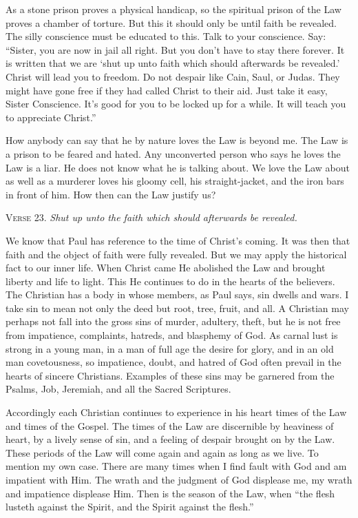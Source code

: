 As a stone prison proves a physical handicap, so the spiritual prison of the Law proves a chamber of torture. But this it should only be until faith be revealed. The silly conscience must be educated to this. Talk to your conscience. Say: “Sister, you are now in jail all right. But you don’t have to stay there forever. It is written that we are ‘shut up unto faith which should afterwards be revealed.’ Christ will lead you to freedom. Do not despair like Cain, Saul, or Judas. They might have gone free if they had called Christ to their aid. Just take it easy, Sister Conscience. It’s good for you to be locked up for a while. It will teach you to appreciate Christ.”

How anybody can say that he by nature loves the Law is beyond me. The Law is a prison to be feared and hated. Any unconverted person who says he loves the Law is a liar. He does not know what he is talking about. We love the Law about as well as a murderer loves his gloomy cell, his straight-jacket, and the iron bars in front of him. How then can the Law justify us?

\textsc{Verse} 23. \emph{Shut up unto the faith which should afterwards be revealed.}

We know that Paul has reference to the time of Christ’s coming. It was then that faith and the object of faith were fully revealed. But we may apply the historical fact to our inner life. When Christ came He abolished the Law and brought liberty and life to light. This He continues to do in the hearts of the believers. The Christian has a body in whose members, as Paul says, sin dwells and wars. I take sin to mean not only the deed but root, tree, fruit, and all. A Christian may perhaps not fall into the gross sins of murder, adultery, theft, but he is not free from impatience, complaints, hatreds, and blasphemy of God. As carnal lust is strong in a young man, in a man of full age the desire for glory, and in an old man covetousness, so impatience, doubt, and hatred of God often prevail in the hearts of sincere Christians. Examples of these sins may be garnered from the Psalms, Job, Jeremiah, and all the Sacred Scriptures.

Accordingly each Christian continues to experience in his heart times of the Law and times of the Gospel. The times of the Law are discernible by heaviness of heart, by a lively sense of sin, and a feeling of despair brought on by the Law. These periods of the Law will come again and again as long as we live. To mention my own case. There are many times when I find fault with God and am impatient with Him. The wrath and the judgment of God displease me, my wrath and impatience displease Him. Then is the season of the Law, when “the flesh lusteth against the Spirit, and the Spirit against the flesh.”

